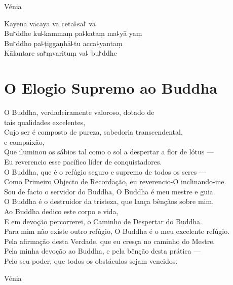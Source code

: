 \begin{instruction}
  Vénia
\end{instruction}

Kāyena vācāya va ceta꜕sā꜓ vā\\
Bu꜓ddhe ku꜕kammaṃ pa꜕kataṃ ma꜕yā yaṃ\\
Bu꜓ddho pa꜕ṭiggaṇhā꜕tu acca꜕yantaṃ\\
Kālantare sa꜓ṃvarituṃ va꜕ bu꜓ddhe

\clearpage

\chapter{O Elogio Supremo ao Buddha}

\begin{leader}
\end{leader}

O Buddha, verdadeiramente valoroso, dotado de\\
\vin tais qualidades  excelentes,\\
Cujo ser é composto de pureza, sabedoria transcendental,\\
\vin e compaixão,\\
Que iluminou os sábios tal como o sol a despertar a flor de lótus ---\\
Eu reverencio esse pacífico líder de conquistadores.\\
O Buddha, que é o refúgio seguro e supremo de todos os seres ---\\
Como Primeiro Objecto de Recordação, eu reverencio-O inclinando-me.\\
Sou de facto o servidor do Buddha, O Buddha é meu mestre e guia.\\
O Buddha é o destruidor da tristeza, que lança bênçãos sobre mim.\\
Ao Buddha dedico este corpo e vida,\\
E em devoção percorrerei, o Caminho de Despertar do Buddha.\\
Para mim não existe outro refúgio, O Buddha é o meu excelente refúgio.\\
Pela afirmação desta Verdade, que eu cresça no caminho do Mestre.\\
Pela minha devoção ao Buddha, e pela bênção desta prática ---\\
Pelo seu poder, que todos os obstáculos sejam vencidos.

\begin{instruction}
  Vénia
\end{instruction}

